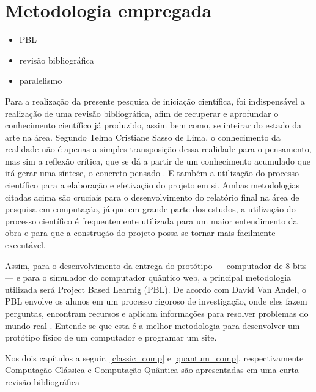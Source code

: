 \section{Metodologia empregada}
\label{methodologies}

\begin{itemize}
\item PBL
\item revisão bibliográfica
\item paralelismo
\end{itemize}

Para a realização da presente pesquisa de iniciação científica, foi indispensável a realização de uma revisão bibliográfica, afim de recuperar e aprofundar o conhecimento científico já produzido, assim bem como, se inteirar do estado da arte na área. Segundo Telma Cristiane Sasso de Lima, o conhecimento da realidade não é apenas a simples transposição dessa realidade para o pensamento, mas sim a reflexão crítica, que se dá a partir de um conhecimento acumulado que irá gerar uma síntese, o concreto pensado \cite{1}. E também a utilização do processo científico para a elaboração e efetivação do projeto em si. Ambas metodologias citadas acima são cruciais para o desenvolvimento do relatório final na área de pesquisa em computação, já que em grande parte dos estudos, a utilização do processo científico é frequentemente utilizada para um maior entendimento da obra e para que a construção do projeto possa se tornar mais facilmente executável.

Assim, para o desenvolvimento da entrega do protótipo — computador de 8-bits — e para o simulador do computador quântico web, a principal metodologia utilizada será Project Based Learnig (PBL). De acordo com David Van Andel, o PBL envolve os alunos em um processo rigoroso de investigação, onde eles fazem perguntas, encontram recursos e aplicam informações para resolver problemas do mundo real \cite{3}. Entende-se que esta é a melhor metodologia para desenvolver um protótipo físico de um computador e programar um site.

Nos dois capítulos a seguir, \ref{classic_comp} e \ref{quantum_comp}, respectivamente Computação Clássica e Computação Quântica são apresentadas em uma curta revisão bibliográfica 

\newpage